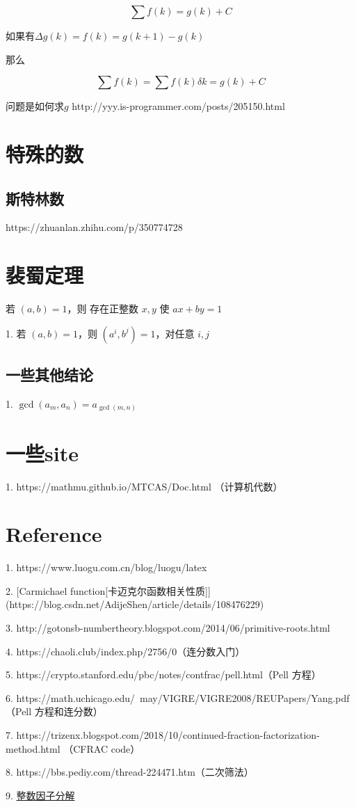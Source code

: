 \documentclass{article}
\begin{document}
\begin{equation}
    \sum f(k) = g(k)+C
\end{equation}

如果有$\Delta g(k)=f(k)=g(k+1)-g(k)$

那么

\begin{equation}
    \sum f(k)=\sum f(k)\delta k=g(k)+C
\end{equation}

问题是如何求$g$ http://yyy.is-programmer.com/posts/205150.html

\section{特殊的数}

\subsection{斯特林数}

https://zhuanlan.zhihu.com/p/350774728

\section{裴蜀定理}

若 $(a,b)=1$，则 存在正整数 $x,y$ 使 $ax+by=1$

1. 若 $(a,b)=1$，则 $(a^i,b^j)=1$，对任意 $i,j$

\subsection{一些其他结论}

1. $\gcd(a_m,a_n)=a_{\gcd(m,n)}$

\section{一些site}

1. https://mathmu.github.io/MTCAS/Doc.html （计算机代数）


\section{Reference}

1. https://www.luogu.com.cn/blog/luogu/latex

2. [Carmichael function[卡迈克尔函数相关性质]](https://blog.csdn.net/AdijeShen/article/details/108476229)

3. http://gotonsb-numbertheory.blogspot.com/2014/06/primitive-roots.html

4. https://chaoli.club/index.php/2756/0（连分数入门）

5. https://crypto.stanford.edu/pbc/notes/contfrac/pell.html（Pell 方程）

6. https://math.uchicago.edu/~may/VIGRE/VIGRE2008/REUPapers/Yang.pdf （Pell 方程和连分数）

7. https://trizenx.blogspot.com/2018/10/continued-fraction-factorization-method.html （CFRAC code）

8. https://bbs.pediy.com/thread-224471.htm（二次筛法）

9. \href{https://mathmu.github.io/MTCAS/doc/IntegerFactorization.html#sec8}{整数因子分解}
\end{document}
